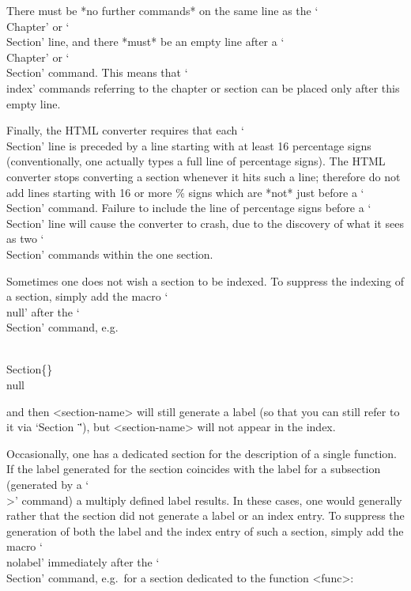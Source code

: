 There must be *no further commands* on the same line as  the  `\\Chapter'
or  `\\Section'  line,  and  there  *must*  be  an  empty  line  after  a
`\\Chapter' or `\\Section' command. This means  that  `\\index'  commands
referring to the chapter or section can be placed only after  this  empty
line.

Finally, the HTML  converter  requires  that  each  `\\Section'  line  is
preceded  by  a  line  starting  with  at  least  16   percentage   signs
(conventionally, one actually types a full line of percentage signs). The
HTML converter stops converting a section whenever it hits such  a  line;
therefore do not add lines starting with 16 or more \%  signs  which  are
*not* just before a `\\Section' command. Failure to include the  line  of
percentage signs before a `\\Section' line will cause  the  converter  to
crash, due to the discovery of what it sees as two  `\\Section'  commands
within the one section.


Sometimes one does not wish a section to  be  indexed.  To  suppress  the
indexing  of  a  section,  simply  add  the  macro  `\\null'  after   the
`\\Section' command, e.g.

\)\\Section\{<section-name>\}\\null

and then <section-name> will still generate a  label  (so  that  you  can
still refer to it via `Section~\"<section-name>\"'),  but  <section-name>
will not appear in the index.

Occasionally, one has a dedicated section for the description of a single
function. If the label generated for the section coincides with the label
for a subsection (generated by a `\\>' command) a multiply defined  label
results. In these cases, one would generally rather that the section  did
not generate a label or an index entry. To  suppress  the  generation  of
both the label and the index entry of such  a  section,  simply  add  the
macro `\\nolabel' immediately after the `\\Section' command,  e.g.~for  a
section dedicated to the function <func>:

